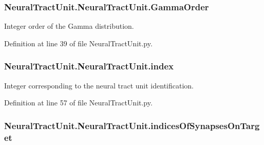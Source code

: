 \subsubsection[{\texorpdfstring{Gamma\+Order}{GammaOrder}}]{\setlength{\rightskip}{0pt plus 5cm}Neural\+Tract\+Unit.\+Neural\+Tract\+Unit.\+Gamma\+Order}\hypertarget{class_neural_tract_unit_1_1_neural_tract_unit_aee01a134ce97127783d75757ec15f352}{}\label{class_neural_tract_unit_1_1_neural_tract_unit_aee01a134ce97127783d75757ec15f352}


Integer order of the Gamma distribution. 



Definition at line 39 of file Neural\+Tract\+Unit.\+py.

\subsubsection[{\texorpdfstring{index}{index}}]{\setlength{\rightskip}{0pt plus 5cm}Neural\+Tract\+Unit.\+Neural\+Tract\+Unit.\+index}\hypertarget{class_neural_tract_unit_1_1_neural_tract_unit_ae98dd2328b661ea541f81a8b4c259557}{}\label{class_neural_tract_unit_1_1_neural_tract_unit_ae98dd2328b661ea541f81a8b4c259557}


Integer corresponding to the neural tract unit identification. 



Definition at line 57 of file Neural\+Tract\+Unit.\+py.

\subsubsection[{\texorpdfstring{indices\+Of\+Synapses\+On\+Target}{indicesOfSynapsesOnTarget}}]{\setlength{\rightskip}{0pt plus 5cm}Neural\+Tract\+Unit.\+Neural\+Tract\+Unit.\+indices\+Of\+Synapses\+On\+Target}\hypertarget{class_neural_tract_unit_1_1_neural_tract_unit_a4e5fa20e16e924e7f27a087e8f7a19a7}{}\label{class_neural_tract_unit_1_1_neural_tract_unit_a4e5fa20e16e924e7f27a087e8f7a19a7}


